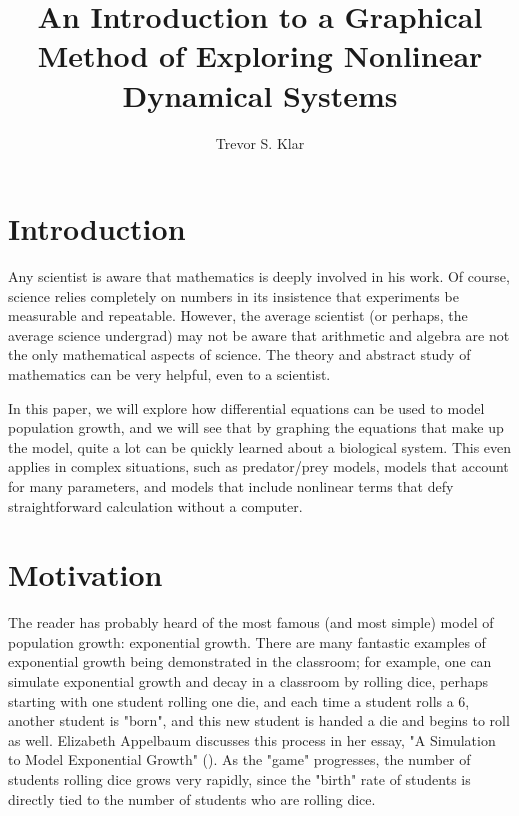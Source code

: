 \documentclass[man, 12pt]{apa6}
\title{An Introduction to a Graphical Method of Exploring Nonlinear Dynamical Systems}
\author{Trevor S. Klar}
\affiliation{California State University, Northridge}
\newcommand{\citep}[1]{(\cite{#1})}
\begin{document}
\maketitle

\section{Introduction}
Any scientist is aware that mathematics is deeply involved in his work. Of course, science relies completely on numbers in its insistence that experiments be measurable and repeatable. However, the average scientist (or perhaps, the average science undergrad) may not be aware that arithmetic and algebra are not the only mathematical aspects of science. The theory and abstract study of mathematics can be very helpful, even to a scientist. 

In this paper, we will explore how differential equations can be used to model population growth, and we will see that by graphing the equations that make up the model, quite a lot can be quickly learned about a biological system. This even applies in complex situations, such as predator/prey models, models that account for many parameters, and models that include nonlinear terms that defy straightforward calculation without a computer. 

\section{Motivation} 
The reader has probably heard of the most famous (and most simple) model of population growth: exponential growth. There are many fantastic examples of exponential growth being demonstrated in the classroom; for example, one can simulate exponential growth and decay in a classroom by rolling dice, perhaps starting with one student rolling one die, and each time a student rolls a 6, another student is "born", and this new student is handed a die and begins to roll as well. Elizabeth Appelbaum discusses this process in her essay, "A Simulation to Model Exponential Growth" \citep{appelbaum_2000}. As the "game" progresses, the number of students rolling dice grows very rapidly, since the "birth" rate of students is directly tied to the number of students who are rolling dice. 
\end{document}
